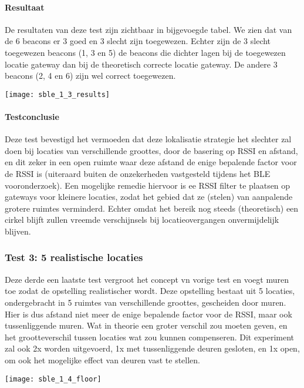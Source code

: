 \paragraph{Resultaat}
\begin{minipage}{0.55\textwidth}
De resultaten van deze test zijn zichtbaar in bijgevoegde tabel. We zien dat van de 6 beacons er 3 goed en 3 slecht zijn toegewezen. Echter zijn de 3 slecht toegewezen beacons (1, 3 en 5) de beacons die dichter lagen bij de toegewezen locatie gateway dan bij de theoretisch correcte locatie gateway. De andere 3 beacons (2, 4 en 6) zijn wel correct toegewezen. 
\end{minipage}
\hfill
\begin{minipage}{0.42\textwidth}
	\texttt{[image: sble\_1\_3\_results]}
\end{minipage}

\paragraph{Testconclusie}
Deze test bevestigd het vermoeden dat deze lokalisatie strategie het slechter zal doen bij locaties van verschillende groottes, door de basering op RSSI en afstand, en dit zeker in een open ruimte waar deze afstand de enige bepalende factor voor de RSSI is (uiteraard buiten de onzekerheden vastgesteld tijdens het BLE vooronderzoek). Een mogelijke remedie hiervoor is ee RSSI filter te plaatsen op gateways voor kleinere locaties, zodat het gebied dat ze (stelen) van aanpalende grotere ruimtes verminderd. Echter omdat het bereik nog steeds (theoretisch) een cirkel blijft zullen vreemde verschijnsels bij locatieovergangen onvermijdelijk blijven.

\subsubsection{Test 3: 5 realistische locaties}
\begin{minipage}{0.55\textwidth}
Deze derde een laatste test vergroot het concept vn vorige test en voegt muren toe zodat de opstelling realistischer wordt. Deze opstelling bestaat uit 5 locaties, ondergebracht in 5 ruimtes van verschillende groottes, gescheiden door muren. Hier is dus afstand niet meer de enige bepalende factor voor de RSSI, maar ook tussenliggende muren. Wat in theorie een groter verschil zou moeten geven, en het grootteverschil tussen locaties wat zou kunnen compenseren. Dit experiment zal ook 2x worden uitgevoerd, 1x met tussenliggende deuren gesloten, en 1x open, om ook het mogelijke effect van deuren vast te stellen.
\end{minipage}
\hfill
\begin{minipage}{0.42\textwidth}
	\texttt{[image: sble\_1\_4\_floor]}
\end{minipage}

